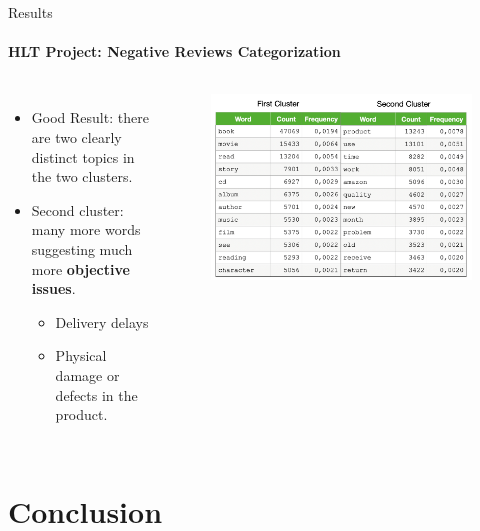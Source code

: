 \documentclass{beamer}
\theoremstyle{definition}
\theoremstyle{plain}
\begin{document}
\begin{frame}{Results}
\framesubtitle{HLT Project: Negative Reviews Categorization}
{\small 
    \begin{columns}
    \begin{itemize}
        \item Good Result: there are two clearly distinct topics in the two clusters.
            \item Second cluster: many more words suggesting much more \textbf{objective issues}.
            \begin{itemize}
                \item Delivery delays
                \item Physical damage or defects in the product.
            \end{itemize}
    \end{itemize}

    \vspace{-0.7cm}
    \begin{figure}
        \centering
        \includegraphics[scale=0.35]{Figures/tabella.png}
    \end{figure}
    \end{columns}
}
\end{frame}


\section{Conclusion}
\end{document}
